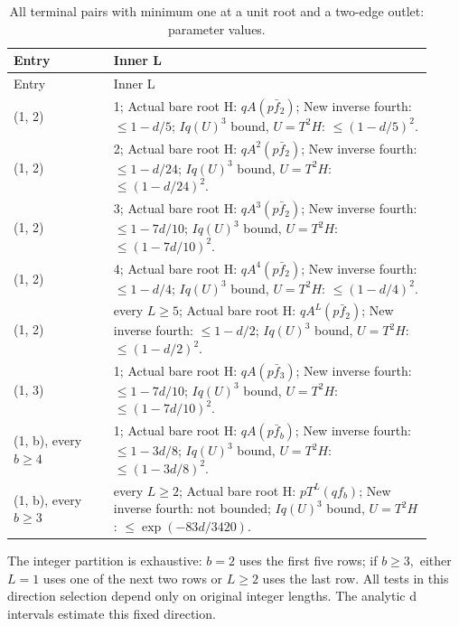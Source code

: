 \begingroup\small
\setlength{\tabcolsep}{3pt}
\setlength{\LTleft}{0pt}\setlength{\LTright}{\fill}
\begin{longtable}{@{}p{0.2200\linewidth}p{0.7000\linewidth}@{}}
\caption{All terminal pairs with minimum one at a unit root and a two-edge outlet: parameter values.}\label{tab:parameters:r2-c026:5}\\
\toprule
Entry & Inner L \\
\midrule\endfirsthead
\toprule
Entry & Inner L \\
\midrule\endhead
\bottomrule\endfoot
(1, 2) & 1; Actual bare root H: \(qA(p\bar f_2)\); New inverse fourth: \(\le 1-d/5\); \(Iq(U)^3\) bound, \(U=T^2H\): \(\le (1-d/5)^2\). \\
\addlinespace[2pt]
(1, 2) & 2; Actual bare root H: \(qA^2(p\bar f_2)\); New inverse fourth: \(\le 1-d/24\); \(Iq(U)^3\) bound, \(U=T^2H\): \(\le (1-d/24)^2\). \\
\addlinespace[2pt]
(1, 2) & 3; Actual bare root H: \(qA^3(p\bar f_2)\); New inverse fourth: \(\le 1-7d/10\); \(Iq(U)^3\) bound, \(U=T^2H\): \(\le (1-7d/10)^2\). \\
\addlinespace[2pt]
(1, 2) & 4; Actual bare root H: \(qA^4(p\bar f_2)\); New inverse fourth: \(\le 1-d/4\); \(Iq(U)^3\) bound, \(U=T^2H\): \(\le (1-d/4)^2\). \\
\addlinespace[2pt]
(1, 2) & every \(L\ge 5\); Actual bare root H: \(qA^L(p\bar f_2)\); New inverse fourth: \(\le 1-d/2\); \(Iq(U)^3\) bound, \(U=T^2H\): \(\le (1-d/2)^2\). \\
\addlinespace[2pt]
(1, 3) & 1; Actual bare root H: \(qA(p\bar f_3)\); New inverse fourth: \(\le 1-7d/10\); \(Iq(U)^3\) bound, \(U=T^2H\): \(\le (1-7d/10)^2\). \\
\addlinespace[2pt]
(1, b), every \(b\ge 4\) & 1; Actual bare root H: \(qA(p\bar f_b)\); New inverse fourth: \(\le 1-3d/8\); \(Iq(U)^3\) bound, \(U=T^2H\): \(\le (1-3d/8)^2\). \\
\addlinespace[2pt]
(1, b), every \(b\ge 3\) & every \(L\ge 2\); Actual bare root H: \(pT^L(qf_b)\); New inverse fourth: not bounded; \(Iq(U)^3\) bound, \(U=T^2H\): \(\le \exp(-83d/3420)\). \\
\end{longtable}
\endgroup


The integer partition is exhaustive: \(b=2\) uses the first five rows; if
\(b\ge 3,\allowbreak \) either \(L=1\) uses one of the next two rows or \(L\ge 2\) uses the last row.
All tests in this direction selection depend only on original integer
lengths. The analytic d intervals estimate this fixed direction.

